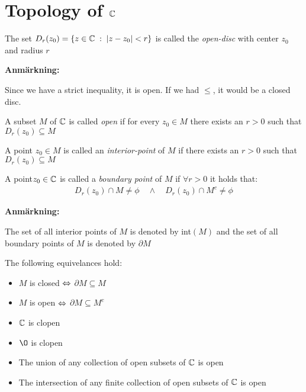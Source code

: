 \section{Topology of $\mathbb{C}$}
\par\bigskip
\begin{theo}{}
  The set $D_r(z_0) = \left\{z\in\mathbb{C}\;:\;\left|z-z_0\right|<r\right\}$ is called the \textit{open-disc} with center $z_0$ and radius $r$
\end{theo}
\par\bigskip
\noindent\textbf{Anmärkning:}\par
\noindent Since we have a strict inequality, it is open. If we had $\leq$, it would be a closed disc.
\par\bigskip
\begin{theo}{}
  A subset $M$ of $\mathbb{C}$ is called \textit{open} if for every $z_0\in M$ there exists an $r>0$ such that $D_r(z_0)\subseteq M$
\end{theo}
\par\bigskip
\begin{theo}{}
  A point $z_0\in M$ is called an \textit{interior-point} of $M$ if there exists an $r>0$ such that $D_r(z_0)\subseteq M$
\end{theo}
\par\bigskip
\begin{theo}{}
  A point$z_0\in\mathbb{C}$ is called a \textit{boundary point} of $M$ if $\forall r>0$ it holds that:
  \begin{equation*}
    \begin{gathered}
      D_r(z_0)\cap M\neq\phi\quad\wedge \quad D_r(z_0)\cap M^c\neq\phi
    \end{gathered}
  \end{equation*}
\end{theo}
\par\bigskip
\noindent\textbf{Anmärkning:}\par
\noindent The set of all interior points of $M$ is denoted by int$(M)$ and the set of all boundary points of $M$  is denoted by $\partial M$
\par\bigskip
\noindent The following equivelances hold:\par
\begin{itemize}
  \item $M$ is closed $\Leftrightarrow$ $\partial M\subseteq M$
  \item $M$ is open $\Leftrightarrow$ $\partial M\subseteq M^c$
  \item $\mathbb{C}$ is clopen
  \item $\O$ is clopen
  \item The union of any collection of open subsets of $\mathbb{C}$ is open
  \item The intersection of any finite collection of open subsets of $\mathbb{C}$ is open
\end{itemize}
